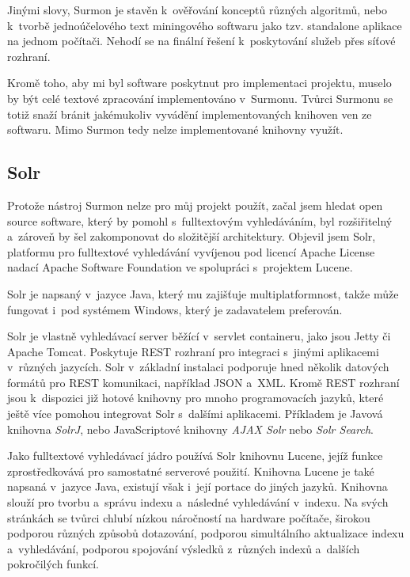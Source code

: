 Jinými slovy, Surmon je stavěn k~ověřování konceptů různých algoritmů, nebo k~tvorbě jednoúčelového text miningového softwaru jako tzv. standalone aplikace na jednom počítači. Nehodí se na finální řešení k~poskytování služeb přes síťové rozhraní.

Kromě toho, aby mi byl software poskytnut pro implementaci projektu, muselo by být celé textové zpracování implementováno v~Surmonu. Tvůrci Surmonu se totiž snaží bránit jakémukoliv vyvádění implementovaných knihoven ven ze softwaru. Mimo Surmon tedy nelze implementované knihovny využít.

\subsection{Solr}
Protože nástroj Surmon nelze pro můj projekt použít, začal jsem hledat open source software, který by pomohl s~fulltextovým vyhledáváním, byl rozšiřitelný a~zároveň by šel zakomponovat do složitější architektury. Objevil jsem Solr\cite{sorl:wiki}, platformu pro fulltextové vyhledávání vyvíjenou pod licencí Apache License nadací Apache Software Foundation ve spolupráci s~projektem Lucene. 

Solr je napsaný v~jazyce Java, který mu  zajišťuje multiplatformnost, takže může fungovat i~pod systémem Windows, který je zadavatelem preferován.

Solr je vlastně vyhledávací server běžící v~servlet containeru, jako jsou Jetty či Apache Tomcat. Poskytuje REST rozhraní  pro integraci s~jinými aplikacemi v~různých jazycích. Solr v~základní instalaci podporuje hned několik datových formátů pro REST komunikaci, například JSON a~XML. Kromě REST rozhraní jsou k~dispozici již hotové knihovny pro mnoho programovacích jazyků, které ještě více pomohou integrovat Solr s~dalšími aplikacemi. Příkladem je Javová knihovna \emph{SolrJ}, nebo JavaScriptové knihovny \emph{AJAX Solr} nebo \emph{Solr Search}.

Jako fulltextové vyhledávací jádro používá Solr knihovnu Lucene, jejíž funkce zprostředkovává pro samostatné serverové použití. Knihovna Lucene je také napsaná v~jazyce Java, existují však i~její portace do jiných jazyků. Knihovna slouží pro tvorbu a~správu indexu a~následné vyhledávání v~indexu. Na svých stránkách\cite{lucene:wiki} se tvůrci chlubí nízkou náročností na hardware počítače, širokou podporou různých způsobů dotazování, podporou simultálního aktualizace indexu a~vyhledávání, podporou spojování výsledků z~různých indexů a~dalších pokročilých funkcí.

